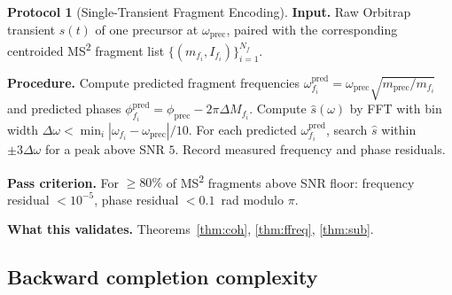 \documentclass[twocolumn,10pt,a4paper]{article}
\theoremstyle{thmstyle}
\theoremstyle{definition}
\newtheorem{protocol}[theorem]{Protocol}
\theoremstyle{remark}
\begin{document}
\begin{protocol}[Single-Transient Fragment Encoding]
\label{prot:sub}
\textbf{Input.} Raw Orbitrap transient $s(t)$ of one precursor at
$\omega_{\mathrm{prec}}$, paired with the corresponding centroided
MS\textsuperscript{2} fragment list
$\{(m_{f_{i}},I_{f_{i}})\}_{i=1}^{N_{f}}$.

\textbf{Procedure.} Compute predicted fragment frequencies
$\omega_{f_{i}}^{\mathrm{pred}}=\omega_{\mathrm{prec}}\sqrt{m_{\mathrm{prec}}/m_{f_{i}}}$
and predicted phases
$\phi_{f_{i}}^{\mathrm{pred}}=\phi_{\mathrm{prec}}-2\pi\Delta M_{f_{i}}$.
Compute $\hat s(\omega)$ by FFT with bin width
$\Delta\omega<\min_{i}|\omega_{f_{i}}-\omega_{\mathrm{prec}}|/10$.
For each predicted $\omega_{f_{i}}^{\mathrm{pred}}$, search $\hat s$
within $\pm 3\Delta\omega$ for a peak above SNR $5$. Record measured
frequency and phase residuals.

\textbf{Pass criterion.} For $\geq 80\%$ of MS\textsuperscript{2}
fragments above SNR floor: frequency residual $<10^{-5}$, phase
residual $<0.1$~rad modulo $\pi$.

\textbf{What this validates.} Theorems~\ref{thm:coh}, \ref{thm:ffreq},
\ref{thm:sub}.
\end{protocol}

\subsection{Backward completion complexity}
\end{document}
